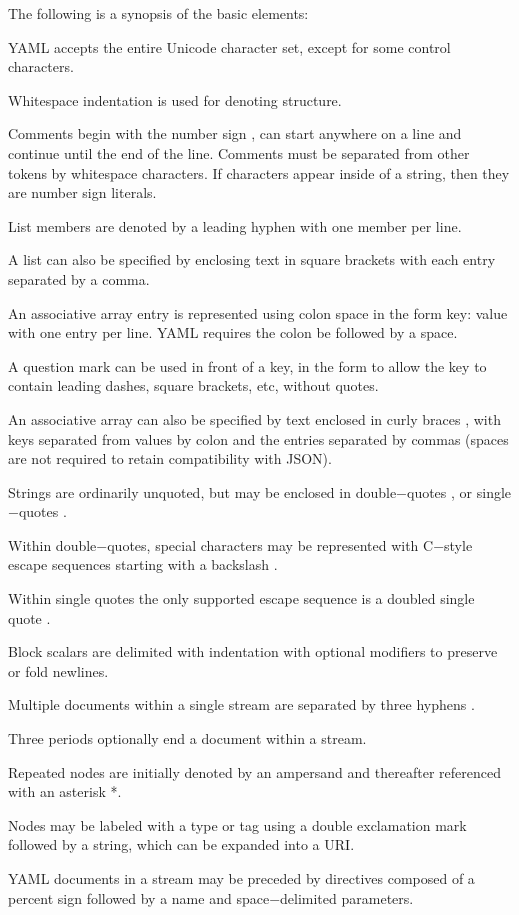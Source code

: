 The following is a synopsis of the basic elements:
\bit
\item YAML accepts the entire Unicode character set, except for some control characters.
\item Whitespace indentation is used for denoting structure.
\item Comments begin with the number sign \code{$\#$}, can start anywhere on a line and continue until the end of the
line. Comments must be separated from other tokens by whitespace characters. If \code{$\#$} characters appear inside
of a string, then they are number sign \code{$\#$} literals.
\item List members are denoted by a leading hyphen \code{$-$} with one member per line.
\item A list can also be specified by enclosing text in square brackets \code{[$\ldots$]} with each entry separated by a
comma.
\item An associative array entry is represented using colon space in the form key: value with one entry per line. YAML
requires the colon be followed by a space.
\item A question mark can be used in front of a key, in the form  to allow the key to contain leading
dashes, square brackets, etc, without quotes.
\item An associative array can also be specified by text enclosed in curly braces \code{$\{\ldots\}$}, with keys separated from
values by colon and the entries separated by commas (spaces are not required to retain compatibility with JSON).
\item Strings are ordinarily unquoted, but may be enclosed in double$-$quotes , or single$-$quotes .
\item Within double$-$quotes, special characters may be represented with C$-$style escape sequences starting with a
backslash \code{$\textbackslash$}.
\item Within single quotes the only supported escape sequence is a doubled single quote .
\item Block scalars are delimited with indentation with optional modifiers to preserve \code{|} or fold \code{>}
newlines.
\item Multiple documents within a single stream are separated by three hyphens \code{\texttt{$-${}$-${}$-$}}.
\item Three periods \code{$\ldots$} optionally end a document within a stream.
\item Repeated nodes are initially denoted by an ampersand \code{$\&$} and thereafter referenced with an asterisk *.
\item Nodes may be labeled with a type or tag using a double exclamation mark \code{!!} followed by a string, which can
be expanded into a URI\@.
\item YAML documents in a stream may be preceded by directives composed of a percent sign \code{$\%$} followed by a name
and space$-$delimited parameters.
\eit

